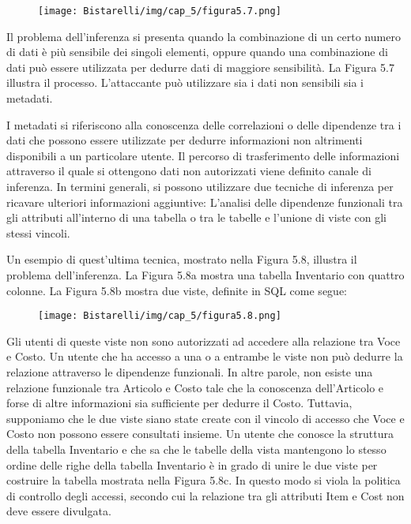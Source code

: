\singlespacing

\begin{figure}[H]
	\centering
    \texttt{[image: Bistarelli/img/cap\_5/figura5.7.png]}
\end{figure}

Il problema dell'inferenza si presenta quando la combinazione di un certo numero di dati è più sensibile dei singoli elementi, oppure quando una combinazione di dati può essere utilizzata per dedurre dati di maggiore sensibilità. La Figura 5.7 illustra il processo. L'attaccante può utilizzare sia i dati non sensibili sia i metadati. 

\singlespacing

I metadati si riferiscono alla conoscenza delle correlazioni o delle dipendenze tra i dati che possono essere utilizzate per dedurre informazioni non altrimenti disponibili a un particolare utente. Il percorso di trasferimento delle informazioni attraverso il quale si ottengono dati non autorizzati viene definito canale di inferenza.
In termini generali, si possono utilizzare due tecniche di inferenza per ricavare ulteriori informazioni aggiuntive: L'analisi delle dipendenze funzionali tra gli attributi all'interno di una tabella o tra le tabelle e l'unione di viste con gli stessi vincoli.

\singlespacing

Un esempio di quest'ultima tecnica, mostrato nella Figura 5.8, illustra il problema dell'inferenza. La Figura 5.8a mostra una tabella Inventario con quattro colonne. La Figura 5.8b mostra due viste, definite in SQL come segue:

\begin{figure}[H]
	\centering
    \texttt{[image: Bistarelli/img/cap\_5/figura5.8.png]}
\end{figure}

Gli utenti di queste viste non sono autorizzati ad accedere alla relazione tra Voce e Costo.
Un utente che ha accesso a una o a entrambe le viste non può dedurre la relazione attraverso le dipendenze funzionali. In altre parole, non esiste una relazione funzionale tra Articolo e Costo tale che la conoscenza dell'Articolo e forse di altre informazioni sia sufficiente per dedurre il Costo. Tuttavia, supponiamo che le due viste siano state create con il vincolo di accesso che Voce e Costo non possono essere consultati insieme. Un utente che conosce la struttura della tabella Inventario e che sa che le tabelle della vista mantengono lo stesso ordine delle righe della tabella Inventario è in grado di unire le due viste per costruire la tabella mostrata nella Figura 5.8c. In questo modo si viola la politica di controllo degli accessi, secondo cui la relazione tra gli attributi Item e Cost non deve essere divulgata.

